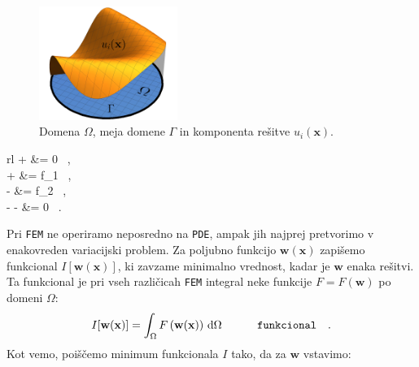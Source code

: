 \begin{figure}
	\centering
	\captionsetup{type=figure}
	\includegraphics[height=3.7cm]{Slike/funkcijaInDomenaG}
	\caption{Domena $\Omega$, meja domene $\Gamma$ in komponenta rešitve $u_i(\mathbf{x})$.}
\label{fig:funkInDom}
\end{figure}

	\begin{IEEEeqnarray}{rl}
		 +  &= 0 \ , \hspace{1.0cm} \\[0.2cm]
		 +  &= f_1 \ , \\[0.2cm]
		 -  &= f_2 \ , \\[0.2cm]
		\omega -  -  &= 0 \ .
	\end{IEEEeqnarray}
\begin{minipage}[l]{0.01\textwidth}
\end{minipage}

Pri \texttt{FEM} ne operiramo neposredno na \texttt{PDE}, ampak jih najprej pretvorimo v enakovreden variacijski problem. Za poljubno funkcijo $\mathbf{w}(\mathbf{x})$ zapišemo funkcional $I[\mathbf{w}(\mathbf{x})]$, ki  zavzame minimalno vrednost, kadar je $\mathbf{w}$ enaka rešitvi. Ta funkcional je pri vseh različicah \texttt{FEM} integral neke funkcije $F = F\left(\mathbf{w}\right)$ po domeni $\Omega$:
\begin{equation}
	I[\mathbf{w}(\mathbf{x})] = \int_{\Omega} F\left(\mathbf{w}(\mathbf{x})\right) \, \mathrm{d} \Omega \hspace{1.1cm} \texttt{funkcional} \quad .
\end{equation}
Kot vemo, poiščemo minimum funkcionala $I$ tako, da za $\mathbf{w}$ vstavimo:

